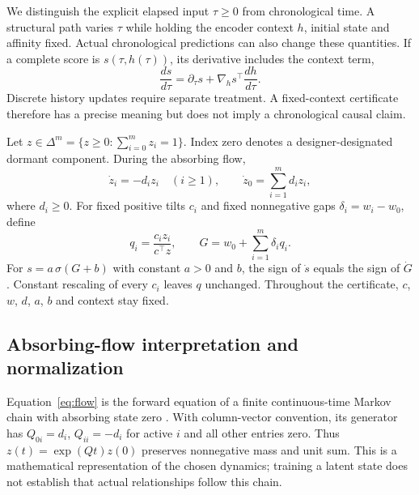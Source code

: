 \documentclass[pdflatex,sn-vancouver-num]{sn-jnl}
\theoremstyle{thmstyleone}
\begin{document}
We distinguish the explicit elapsed input $\tau\ge0$ from chronological time. A structural path varies $\tau$ while holding the encoder context $h$, initial state and affinity fixed. Actual chronological predictions can also change these quantities. If a complete score is $s(\tau,h(\tau))$, its derivative includes the context term,
\begin{equation}\label{eq:chain}
\frac{d s}{d\tau}=\partial_\tau s+\nabla_hs^\top\frac{dh}{d\tau}.
\end{equation}
Discrete history updates require separate treatment. A fixed-context certificate therefore has a precise meaning but does not imply a chronological causal claim.

Let $z\in\Delta^m=\{z\ge0:\sum_{i=0}^m z_i=1\}$. Index zero denotes a designer-designated dormant component. During the absorbing flow,
\begin{equation}\label{eq:flow}
\dot z_i=-d_i z_i\quad(i\ge1),\qquad
\dot z_0=\sum_{i=1}^m d_i z_i,
\end{equation}
where $d_i\ge0$. For fixed positive tilts $c_i$ and fixed nonnegative gaps $\delta_i=w_i-w_0$, define
\begin{equation}\label{eq:tilt}
q_i=\frac{c_i z_i}{c^\top z},\qquad
G=w_0+\sum_{i=1}^m\delta_i q_i.
\end{equation}
For $s=a\,\sigma(G+b)$ with constant $a>0$ and $b$, the sign of $\dot s$ equals the sign of $\dot G$. Constant rescaling of every $c_i$ leaves $q$ unchanged. Throughout the certificate, $c$, $w$, $d$, $a$, $b$ and context stay fixed.

\subsection{Absorbing-flow interpretation and normalization}
Equation~\eqref{eq:flow} is the forward equation of a finite continuous-time Markov chain with absorbing state zero \cite{norris}. With column-vector convention, its generator has $Q_{0i}=d_i$, $Q_{ii}=-d_i$ for active $i$ and all other entries zero. Thus $z(t)=\exp(Qt)z(0)$ preserves nonnegative mass and unit sum. This is a mathematical representation of the chosen dynamics; training a latent state does not establish that actual relationships follow this chain.
\end{document}
